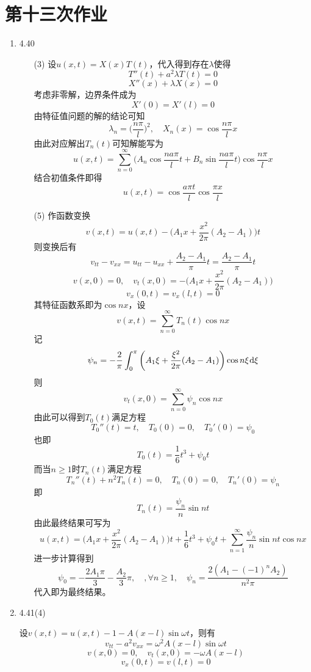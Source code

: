 \documentclass[a4paper,UTF8,fontset=windows,10pt]{ctexart}
\newcommand*{\dr}{\hspace{0.07em}\mathrm{d}}
\begin{document}
\section{第十三次作业}
\begin{enumerate}
    \item 4.40
    \begin{enumerate}
        \item[(3)] 设$u(x,t)=X(x)T(t)$，代入得到存在$\lambda$使得
        $$T''(t)+a^2\lambda T(t)=0$$
        $$X''(x)+\lambda X(x)=0$$
        考虑非零解，边界条件成为
        $$X'(0)=X'(l)=0$$
        由特征值问题的解的结论可知
        $$\lambda_n=\bigg(\frac{n\pi}{l}\bigg)^2,\quad X_n(x)=\cos\frac{n\pi}{l}x$$
        由此对应解出$T_n(t)$可知解能写为
        $$u(x,t)=\sum_{n=0}^\infty\bigg(A_n\cos\frac{na\pi}{l}t+B_n\sin\frac{na\pi}{l}t\bigg)\cos\frac{n\pi}{l}x$$
        结合初值条件即得
        $$u(x,t)=\cos\frac{a\pi t}{l}\cos\frac{\pi x}{l}$$
    
        \item[(5)]  作函数变换
        $$v(x,t)=u(x,t)-\bigg(A_1x+\frac{x^2}{2\pi}(A_2-A_1)\bigg)t$$
        则变换后有
        $$v_{tt}-v_{xx}=u_{tt}-u_{xx}+\frac{A_2-A_1}{\pi}t=\frac{A_2-A_1}{\pi}t$$
        $$v(x,0)=0,\quad v_t(x,0)=-\bigg(A_1x+\frac{x^2}{2\pi}(A_2-A_1)\bigg)$$
        $$v_x(0,t)=v_x(l,t)=0$$
        其特征函数系即为$\cos nx$，设
        $$v(x,t)=\sum_{n=0}^\infty T_n(t)\cos nx$$
        记
        $$\psi_n=-\frac{2}{\pi}\int_0^\pi\bigg(A_1\xi+\frac{\xi^2}{2\pi}(A_2-A_1)\bigg)\cos n\xi\dr\xi$$
        则
        $$v_t(x,0)=\sum_{n=0}^\infty\psi_n\cos nx$$
        由此可以得到$T_0(t)$满足方程
        $$T_0''(t)=t,\quad T_0(0)=0,\quad T_0'(0)=\psi_0$$
        也即
        $$T_0(t)=\frac{1}{6}t^3+\psi_0t$$
        而当$n\ge1$时$T_n(t)$满足方程
        $$T_n''(t)+n^2T_n(t)=0,\quad T_n(0)=0,\quad T_n'(0)=\psi_n$$
        即
        $$T_n(t)=\frac{\psi_n}{n}\sin nt$$
        由此最终结果可写为
        $$u(x,t)=\bigg(A_1x+\frac{x^2}{2\pi}(A_2-A_1)\bigg)t+\frac{1}{6}t^3+\psi_0t+\sum_{n=1}^\infty\frac{\psi_n}{n}\sin nt\cos nx$$
        进一步计算得到
        $$\psi_0=-\frac{2A_1\pi}{3}-\frac{A_2}{3}\pi,\quad,\forall n\ge1,\quad\psi_n=\frac{2(A_1-(-1)^nA_2)}{n^2\pi}$$
        代入即为最终结果。
    \end{enumerate}
    
    \item 4.41(4)
    
    设$v(x,t)=u(x,t)-1-A(x-l)\sin\omega t$，则有
    $$v_{tt}-a^2v_{xx}=\omega^2A(x-l)\sin\omega t$$
    $$v(x,0)=0,\quad v_t(x,0)=-\omega A(x-l)$$
    $$v_x(0,t)=v(l,t)=0$$
    

\end{enumerate}
\end{document}
